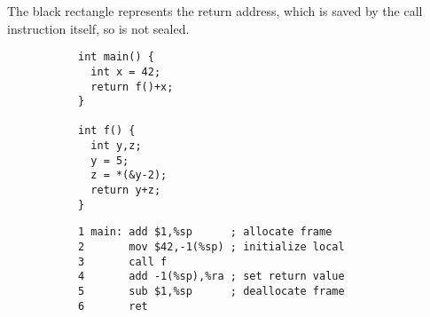 \documentclass[acmsmall,review,anonymous]{acmart}\settopmatter{printfolios=true,printccs=false,printacmref=false}
\begin{document}
The black rectangle represents the return address, which is saved by the call
instruction itself, so is not sealed.

\begin{figure}
\begin{subfigure}{.2\textwidth}
{\small
\begin{verbatim}
int main() {
  int x = 42;
  return f()+x;
}

int f() {
  int y,z;
  y = 5;
  z = *(&y-2);
  return y+z;
}
\end{verbatim}
}
\end{subfigure}
\begin{subfigure}{.5\textwidth}
{\small
\begin{verbatim}
1 main: add $1,%sp      ; allocate frame
2       mov $42,-1(%sp) ; initialize local
3       call f
4       add -1(%sp),%ra ; set return value
5       sub $1,%sp      ; deallocate frame
6       ret


\end{verbatim}}
\end{subfigure}
\end{figure}
\end{document}
